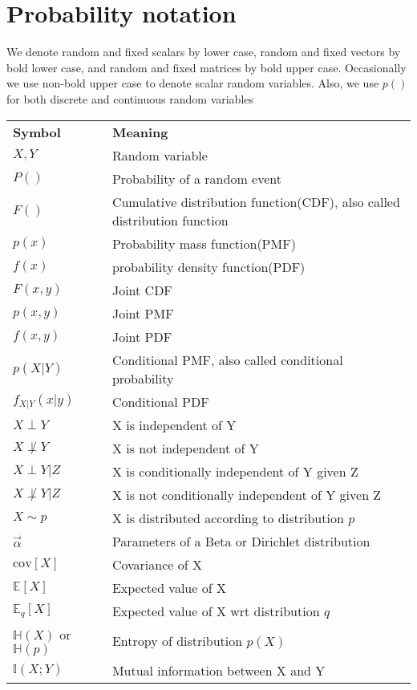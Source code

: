 \section*{Probability notation}
We denote random and fixed scalars by lower case, random and fixed vectors by bold lower case, and random and fixed matrices by bold upper case. Occasionally we use non-bold upper case to denote scalar random variables. Also, we use $p()$ for both discrete and continuous random variables

\begin{longtable}{ll}
\hline\noalign{\smallskip}
\textbf{Symbol} & \textbf{Meaning} \\
\noalign{\smallskip}\hline\noalign{\smallskip}
$X,Y$ & Random variable\\
$P()$ & Probability of a random event\\
$F()$ & Cumulative distribution function(CDF), also called distribution function\\
$p(x)$ & Probability mass function(PMF)\\
$f(x)$ & probability density function(PDF) \\
$F(x,y)$ & Joint CDF\\
$p(x,y)$ & Joint PMF \\
$f(x,y)$ & Joint PDF\\
$p(X|Y)$ & Conditional PMF, also called conditional probability\\
$f_{X|Y}(x|y)$ & Conditional PDF\\
$X \perp Y$ & X is independent of Y\\
$X \not\perp Y$ & X is not independent of Y\\
$X \perp Y | Z $ & X is conditionally independent of Y given Z\\
$X \not\perp Y | Z $ & X is not conditionally independent of Y given Z\\
$X \sim p$ & X is distributed according to distribution $p$\\
$\vec{\alpha}$ & Parameters of a Beta or Dirichlet distribution\\
$\mathrm{cov}[X]$ & Covariance of X\\
$\mathbb{E}[X]$ & Expected value of X\\
$\mathbb{E}_q[X]$ & Expected value of X wrt distribution $q$\\
$\mathbb{H}(X)$ or $\mathbb{H}(p)$ & Entropy of distribution $p(X)$\\
$\mathbb{I}(X;Y)$ & Mutual information between X and Y\\

\end{longtable}
